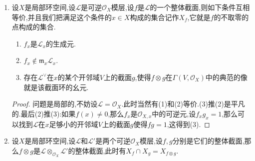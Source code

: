 \begin{enumerate}
\begin{proof}
		不妨设$\mathscr{L}=\mathscr{O}_Y^n$,按照$f^*$和$f_*$都是加性函子,又归结为设$n=1$,此时这个同构归结为$f^*\mathscr{O}_Y=\mathscr{O}_X$.
	\end{proof}
	\item 设$X$是局部环空间,设$\mathscr{L}$是可逆$\mathscr{O}_X$模层,设$f$是$\mathscr{L}$的一个整体截面,则如下条件互相等价,并且我们把满足这个条件的$x\in X$构成的集合记作$X_f$,它就是$f$的不取零的点构成的集合.
	\begin{enumerate}[(1)]
		\item $f_x$是$\mathscr{L}_x$的生成元.
		\item $f_x\not\in\mathfrak{m}_x\mathscr{L}_x$.
		\item 存在$\mathscr{L}^{\vee}$在$x$的某个开邻域$V$上的截面$g$,使得$f\otimes g$在$\Gamma(V,\mathscr{O}_X)$中的典范的像就是该截面环的幺元.
	\end{enumerate}
	\begin{proof}
		
		问题是局部的,不妨设$\mathscr{L}=\mathscr{O}_X$.此时当然有(1)和(2)等价.(3)推(2)是平凡的.最后(2)推(3):如果$f(x)\not=0$,那么$f_x$是$\mathscr{O}_{X,x}$中的可逆元,设$f_xg_x=1$,那么可以找到$\mathscr{L}$在$x$足够小的开邻域$V$上的截面$g$使得$fg=1$,这得到(3).
	\end{proof}
	\item 设$X$是局部环空间,设$\mathscr{L}$和$\mathscr{L}'$是两个可逆$\mathscr{O}_X$模层,设$f,g$分别是它们的整体截面,那么$f\otimes g$是$\mathscr{L}\otimes_{\mathscr{O}_X}\mathscr{L}'$的整体截面,此时有$X_f\cap X_g=X_{f\otimes g}$.
\end{enumerate}
